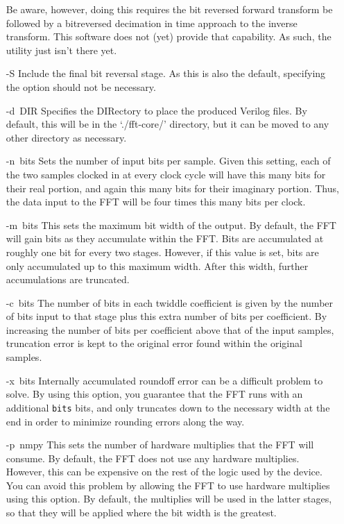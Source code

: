 \documentclass{gqtekspec}
\begin{document}
\begin{itemize}
	Be aware, however, doing this requires the bit reversed forward
	transform be followed by a bitreversed decimation in time approach
	to the inverse transform.  This software does not (yet) provide that
	capability.  As such, the utility just isn't there yet.
\item[\hbox{-S}]
	Include the final bit reversal stage.  As this is also the default,
	specifying the option should not be necessary.
\item[\hbox{-d DIR}]
	Specifies the DIRectory to place the produced Verilog files.  By
	default, this will be in the `./fft-core/' directory, but it can
	be moved to any other directory as necessary.
\item[\hbox{-n bits}] Sets the number of input bits per sample.  Given this
	setting, each of the two samples clocked in at every clock cycle
	will have this many bits for their real portion, and again this many
	bits for their imaginary portion.  Thus, the data input to the
	FFT will be four times this many bits per clock.
\item[\hbox{-m bits}] This sets the maximum bit width of the output.
	By default, the FFT will gain bits as they accumulate within
	the FFT.  Bits are accumulated at roughly one bit for every two stages.
	However, if this value is set, bits are only accumulated up to this
	maximum width.  After this width, further accumulations are truncated.
\item[\hbox{-c bits}] The number of bits in each twiddle coefficient is given
	by the number of bits input to that stage plus this extra number of
	bits per coefficient.  By increasing the number of bits per coefficient
	above that of the input samples, truncation error is kept to the
	original error found within the original samples.
\item[\hbox{-x bits}] Internally accumulated roundoff error can be a difficult
	problem to solve.  By using this option, you guarantee that the FFT
	runs with an additional {\tt bits} bits, and only truncates down to
	the necessary width at the end in order to minimize rounding
	errors along the way.
\item[\hbox{-p nmpy}] This sets the number of hardware multiplies that the FFT
	will consume.  By default, the FFT does not use any hardware multiplies.
	However, this can be expensive on the rest of the logic used by the
	device.  You can avoid this problem by allowing the FFT to use
	hardware multiplies using this option.  By default, the multiplies will
	be used in the latter stages, so that they will be applied where
	the bit width is the greatest.
\end{itemize}
\end{document}
